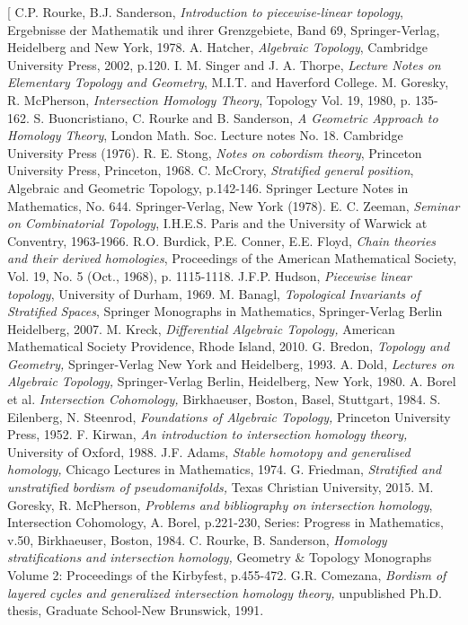 \documentclass{scrreprt}
\begin{document}
\begin{thebibliography}[
C.P. Rourke, B.J. Sanderson, \textit{Introduction to piecewise-linear topology}, Ergebnisse der Mathematik und ihrer Grenzgebiete, Band 69, Springer-Verlag, Heidelberg and New York, 1978.
A. Hatcher, \textit{Algebraic Topology}, Cambridge University Press, 2002, p.120.
I. M. Singer and J. A. Thorpe, \textit{Lecture Notes on Elementary Topology and Geometry}, M.I.T. and Haverford College.
M. Goresky, R. McPherson, \textit{Intersection Homology Theory}, Topology Vol. 19, 1980, p. 135-162.
S. Buoncristiano, C. Rourke and B. Sanderson, \textit{A Geometric Approach to Homology Theory}, London Math. Soc. Lecture notes No. 18. Cambridge University Press (1976).
R. E. Stong, \textit{Notes on cobordism theory}, Princeton University Press, Princeton, 1968.
C. McCrory, \textit{Stratified general position}, Algebraic and Geometric Topology, p.142-146. Springer Lecture Notes in Mathematics, No. 644. Springer-Verlag, New York (1978).
E. C. Zeeman, \textit{Seminar on Combinatorial Topology}, I.H.E.S. Paris and the University of Warwick at Conventry, 1963-1966.
R.O. Burdick, P.E. Conner, E.E. Floyd, \textit{Chain theories and their derived homologies},  Proceedings of the American Mathematical Society, Vol. 19, No. 5 (Oct., 1968), p. 1115-1118.
J.F.P. Hudson, \textit{Piecewise linear topology}, University of Durham, 1969.
M. Banagl, \textit{Topological Invariants of Stratified Spaces}, Springer Monographs in Mathematics, Springer-Verlag Berlin Heidelberg, 2007.
M. Kreck, \textit{Differential Algebraic Topology,} American Mathematical Society Providence, Rhode Island, 2010.
G. Bredon, \textit{Topology and Geometry,} Springer-Verlag New York and Heidelberg, 1993.
A. Dold, \textit{Lectures on Algebraic Topology,} Springer-Verlag Berlin, Heidelberg, New York, 1980.
A. Borel et al. \textit{Intersection Cohomology,} Birkhaeuser, Boston, Basel, Stuttgart, 1984.
S. Eilenberg, N. Steenrod, \textit{Foundations of Algebraic Topology,} Princeton University Press, 1952.
F. Kirwan, \textit{An introduction to intersection homology theory,} University of Oxford, 1988.
J.F. Adams, \textit{Stable homotopy and generalised homology,} Chicago Lectures in Mathematics, 1974.
G. Friedman, \textit{Stratified and unstratified bordism of pseudomanifolds,} 	Texas Christian University, 2015.
M. Goresky, R. McPherson, \textit{Problems and bibliography on intersection homology}, Intersection Cohomology, A. Borel, p.221-230, Series: Progress in Mathematics, v.50, Birkhaeuser, Boston, 1984.
C. Rourke, B. Sanderson, \textit{Homology stratifications and intersection homology,} Geometry \& Topology Monographs Volume 2: Proceedings of the Kirbyfest, p.455-472.
G.R. Comezana, \textit{Bordism of layered cycles and generalized intersection homology theory,} unpublished Ph.D. thesis, Graduate School-New Brunswick, 1991.
\end{thebibliography}
\end{document}
